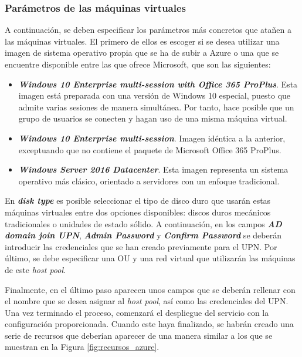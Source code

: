 \subsubsection{Parámetros de las máquinas virtuales}
A continuación, se deben especificar los parámetros más concretos que atañen a las máquinas virtuales. El primero de ellos es escoger si se desea utilizar una imagen de sistema operativo propia que se ha de subir a Azure o una que se encuentre disponible entre las que ofrece Microsoft, que son las siguientes:

\begin{itemize}
    \item \textbf{\textit{Windows 10 Enterprise multi-session with Office 365 ProPlus}}. Esta imagen está preparada con una versión de Windows 10 especial, puesto que admite varias sesiones de manera simultánea. Por tanto, hace posible que un grupo de usuarios se conecten y hagan uso de una misma máquina virtual.
    
    \item \textbf{\textit{Windows 10 Enterprise multi-session}}. Imagen idéntica a la anterior, exceptuando que no contiene el paquete de Microsoft Office 365 ProPlus.
    
    \item \textbf{\textit{Windows Server 2016 Datacenter}}. Esta imagen representa un sistema operativo más clásico, orientado a servidores con un enfoque tradicional.
\end{itemize}

En \textbf{\textit{disk type}} es posible seleccionar el tipo de disco duro que usarán estas máquinas virtuales entre dos opciones disponibles: discos duros mecánicos tradicionales o unidades de estado sólido. A continuación, en los campos \textbf{\textit{AD domain join UPN}}, \textbf{\textit{Admin Password}} y \textbf{\textit{Confirm Password}} se deberán introducir las credenciales que se han creado previamente para el \acf{UPN}. Por último, se debe especificar una \acf{OU} y una red virtual que utilizarán las máquinas de este \textit{host pool}.

Finalmente, en el último paso aparecen unos campos que se deberán rellenar con el nombre que se desea asignar al \textit{host pool}, así como las credenciales del \acs{UPN}. Una vez terminado el proceso, comenzará el despliegue del servicio con la configuración proporcionada. Cuando este haya finalizado, se habrán creado una serie de recursos que deberían aparecer de una manera similar a los que se muestran en la Figura \ref{fig:recursos_azure}.

